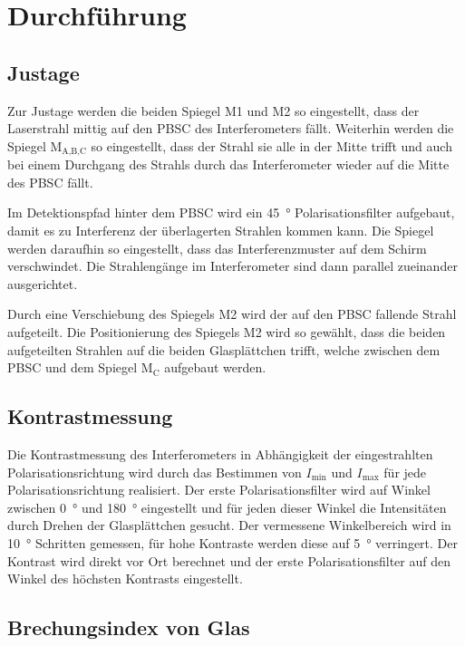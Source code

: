 \section{Durchführung}

\subsection{Justage}
Zur Justage werden die beiden Spiegel M1 und M2 so eingestellt, dass der Laserstrahl mittig auf den PBSC des Interferometers fällt.
Weiterhin werden die Spiegel M$_\text{A,B,C}$ so eingestellt, dass der Strahl sie alle in der Mitte trifft und auch bei einem Durchgang des Strahls durch das Interferometer wieder auf die Mitte des PBSC fällt.\par
Im Detektionspfad hinter dem PBSC wird ein \SI{45}{\degree} Polarisationsfilter aufgebaut, damit es zu Interferenz der überlagerten Strahlen kommen kann.
Die Spiegel werden daraufhin so eingestellt, dass das Interferenzmuster auf dem Schirm verschwindet.
Die Strahlengänge im Interferometer sind dann parallel zueinander ausgerichtet.
\par\smallskip
Durch eine Verschiebung des Spiegels M2 wird der auf den PBSC fallende Strahl aufgeteilt.
Die Positionierung des Spiegels M2 wird so gewählt, dass die beiden aufgeteilten Strahlen auf die beiden Glasplättchen trifft, welche zwischen dem PBSC und dem Spiegel M$_\text{C}$ aufgebaut werden.

\subsection{Kontrastmessung}
Die Kontrastmessung des Interferometers in Abhängigkeit der eingestrahlten Polarisationsrichtung wird durch das Bestimmen von $I_\text{min}$ und $I_\text{max}$ für jede Polarisationsrichtung realisiert.
Der erste Polarisationsfilter wird auf Winkel zwischen \SI{0}{\degree} und \SI{180}{\degree} eingestellt und für jeden dieser Winkel die Intensitäten durch Drehen der Glasplättchen gesucht.
Der vermessene Winkelbereich wird in \SI{10}{\degree} Schritten gemessen, für hohe Kontraste werden diese auf \SI{5}{\degree} verringert.
Der Kontrast wird direkt vor Ort berechnet und der erste Polarisationsfilter auf den Winkel des höchsten Kontrasts eingestellt.

\subsection{Brechungsindex von Glas}

